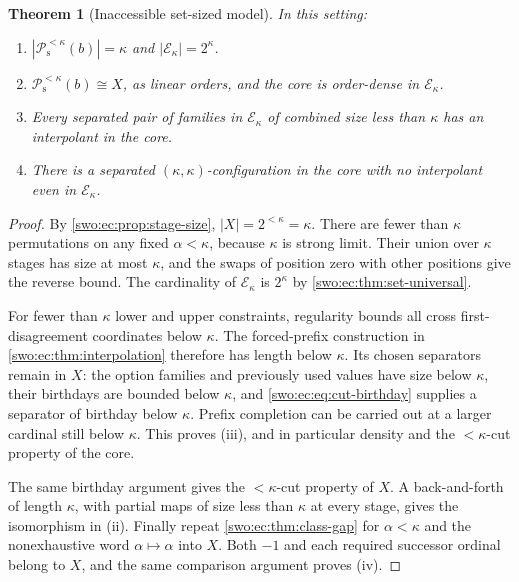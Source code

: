 \documentclass[11pt]{article}
\newtheorem{theorem}{Theorem}[section]
\theoremstyle{definition}
\theoremstyle{remark}
\newcommand{\Psupp}{\mathcal P_{\mathrm{s}}}
\begin{document}
\begin{theorem}[Inaccessible set-sized model]\label{swo:ec:thm:inaccessible}
In this setting:
\begin{enumerate}[label=(\roman*)]
\item $|\Psupp^{<\kappa}(b)|=\kappa$ and
      $|\mathcal E_\kappa|=2^\kappa$.
\item $\Psupp^{<\kappa}(b)\cong X$, as linear orders, and the core is
      order-dense in $\mathcal E_\kappa$.
\item Every separated pair of families in $\mathcal E_\kappa$ of combined
      size less than $\kappa$ has an interpolant in the core.
\item There is a separated $(\kappa,\kappa)$-configuration in the core
      with no interpolant even in $\mathcal E_\kappa$.
\end{enumerate}
\end{theorem}
\begin{proof}
By \cref{swo:ec:prop:stage-size}, $|X|=2^{<\kappa}=\kappa$. There are fewer than
$\kappa$ permutations on any fixed $\alpha<\kappa$, because $\kappa$
is strong limit. Their union over $\kappa$ stages has size at most
$\kappa$, and the swaps of position zero with other positions give the
reverse bound. The cardinality of $\mathcal E_\kappa$ is
$2^\kappa$ by \cref{swo:ec:thm:set-universal}.

For fewer than $\kappa$ lower and upper constraints, regularity bounds
all cross first-disagreement coordinates below $\kappa$. The forced-prefix
construction in \cref{swo:ec:thm:interpolation} therefore has length below
$\kappa$. Its chosen separators remain in $X$: the option families and
previously used values have size below $\kappa$, their birthdays are
bounded below $\kappa$, and \eqref{swo:ec:eq:cut-birthday} supplies a separator
of birthday below $\kappa$. Prefix completion can be carried out at a
larger cardinal still below $\kappa$. This proves (iii), and in particular
density and the $<\kappa$-cut property of the core.

The same birthday argument gives the $<\kappa$-cut property of $X$.
A back-and-forth of length $\kappa$, with partial maps of size less
than $\kappa$ at every stage, gives the isomorphism in (ii).
Finally repeat \cref{swo:ec:thm:class-gap} for $\alpha<\kappa$ and the
nonexhaustive word $\alpha\mapsto\alpha$ into $X$. Both $-1$ and each
required successor ordinal belong to $X$, and the same comparison
argument proves (iv).
\end{proof}
\end{document}
